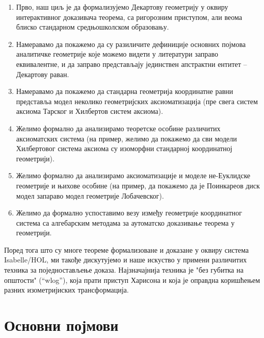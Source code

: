 \begin{enumerate}
\item Прво, наш циљ је да формализујемо Декартову геометрију у оквиру
      интерактивног доказивача теорема, са ригорозним приступом, али веома блиско
      стандарном средњошколском образовању.
\item Намеравамо да покажемо да су разиличите дефиниције основних појмова
      аналитичке геометрије које можемо видети у литератури заправо еквивалентне,
      и да заправо представљају јединствен апстрактни ентитет -- Декартову раван.
\item Намеравамо да покажемо да стандарна геометрија координатне равни
      представља модел неколико геометријских аксиоматизација (пре свега
      систем аксиома Тарског и Хилбертов систем аксиома).
\item Желимо формално да анализирамо теоретске особине различитих аксиоматских система
      (на пример, желимо да покажемо да сви модели Хилбертовог система аксиома су
      изоморфни стандарној координатној геометрији).
\item Желимо формално да анализирамо аксиоматизације и моделе не-Еуклидске геометрије
      и њихове особине (на пример, да покажемо да је Поинкареов диск модел запараво модел
      геометрије Лобачевског).
\item Желимо да формално успоставимо везу између геометрије координатног система са
      алгебарским методама за аутоматско доказивање теорема у геометрији.
\end{enumerate}



Поред тога што су многе теореме формализоване и доказане у оквиру
система Isabelle/HOL, ми такође дискутујемо и наше искуство у примени
различитих техника за поједностављење доказа.  Најзначајнија техника
је "без губитка на општости" (``wlog''), која прати приступ
Харисона\cite{wlog} и која је оправдна коришћењем разних
изометријиских трансформација.

\section{Основни појмови}
\label{sec:background}
